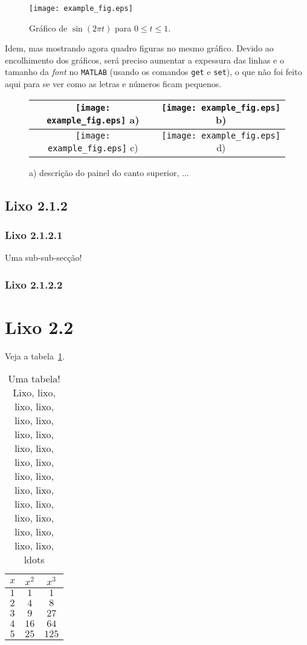 \documentclass[11pt,twoside,a4paper]{report}
\begin{document}
\begin{figure}
  \centering
  \texttt{[image: example\_fig.eps]}
  \caption{Gr\'afico de $\sin(2\pi t)$ para $0\leq t\leq 1$.}
  \label{f:seno}
\end{figure}

Idem, mas mostrando agora quadro figuras no mesmo gr\'afico. Devido ao encolhimento dos
gr\'aficos, ser\'a preciso aumentar a expessura das linhas e o tamanho da \textit{font} no
\texttt{MATLAB} (usando os comandos \verb+get+ e \verb+set+), o que n\~ao foi feito aqui para se
ver como as letras e n\'umeros ficam pequenos.
\begin{figure}
  \centering
  \begin{tabular}{|c|c|}
    \hline
      \texttt{[image: example\_fig.eps]} a) &
      \texttt{[image: example\_fig.eps]} b) \\
    \hline
      \texttt{[image: example\_fig.eps]} c) &
      \texttt{[image: example\_fig.eps]} d) \\
    \hline
  \end{tabular}
  \caption{a) descri\c c\~ao do painel do canto superior, $\ldots$}
  \label{f:seno2}
\end{figure}


\subsection{Lixo 2.1.2}

\subsubsection{Lixo 2.1.2.1}

Uma sub-sub-sec\c c\~ao!


\subsubsection{Lixo 2.1.2.2}


\section{Lixo 2.2}

Veja a tabela~\ref{t:tabela1}.

\begin{table}[hbt]
  \centering
  \begin{tabular}{c|c|c}
    $x$ & $x^2$ & $x^3$ \\\hline
    $1$ &   $1$ &   $1$ \\
    $2$ &   $4$ &   $8$ \\
    $3$ &   $9$ &  $27$ \\
    $4$ &  $16$ &  $64$ \\
    $5$ &  $25$ & $125$
  \end{tabular}
  \caption[Uma tabela!]{Uma tabela! Lixo, lixo, lixo, lixo, lixo, lixo, lixo, lixo, lixo, lixo,
    lixo, lixo, lixo, lixo, lixo, lixo, lixo, lixo, lixo, lixo, lixo, lixo, lixo, lixo, ldots}
  \label{t:tabela1}%
\end{table}
\end{document}
